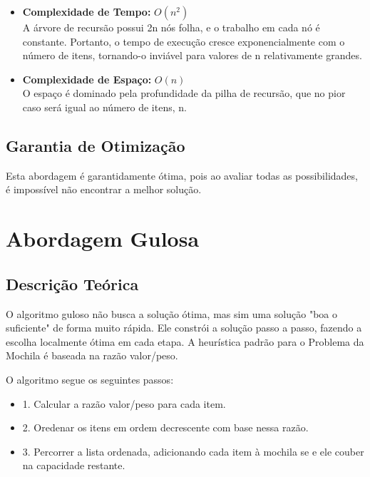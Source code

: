 \documentclass[12pt, a4paper]{article}
\begin{document}
\indent 

\begin{itemize}
    \item \textbf{Complexidade de Tempo:} $O(n^2)$\\
    A árvore de recursão possui 2n nós folha, e o trabalho em cada nó é constante. Portanto, o tempo de execução cresce exponencialmente com o número de itens, tornando-o inviável para valores de n relativamente grandes.

    \item \textbf{Complexidade de Espaço:} $O(n)$\\
    O espaço é dominado pela profundidade da pilha de recursão, que no pior caso será igual ao número de itens, n.
    
\end{itemize}

\subsection{Garantia de Otimização}

\indent Esta abordagem é garantidamente ótima, pois ao avaliar todas as possibilidades, é impossível não encontrar a melhor solução.

\section{Abordagem Gulosa}

\subsection{Descrição Teórica}

\indent O algoritmo guloso não busca a solução ótima, mas sim uma solução "boa o suficiente" de forma muito rápida. Ele constrói a solução passo a passo, fazendo a escolha localmente ótima em cada etapa. A heurística padrão para o Problema da Mochila é baseada na razão valor/peso.

\indent O algoritmo segue os seguintes passos:

\begin{itemize}
    \item 1. Calcular a razão valor/peso para cada item.
    \item 2. Oredenar os itens em ordem decrescente com base nessa razão.
    \item 3. Percorrer a lista ordenada, adicionando cada item à mochila se e ele couber na capacidade restante.
\end{itemize}
\end{document}

